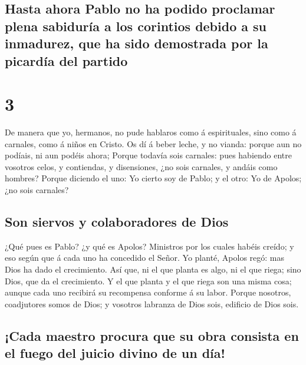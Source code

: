 \hypertarget{hasta-ahora-pablo-no-ha-podido-proclamar-plena-sabiduruxeda-a-los-corintios-debido-a-su-inmadurez-que-ha-sido-demostrada-por-la-picarduxeda-del-partido}{%
\subsection{Hasta ahora Pablo no ha podido proclamar plena sabiduría a
los corintios debido a su inmadurez, que ha sido demostrada por la
picardía del
partido}\label{hasta-ahora-pablo-no-ha-podido-proclamar-plena-sabiduruxeda-a-los-corintios-debido-a-su-inmadurez-que-ha-sido-demostrada-por-la-picarduxeda-del-partido}}

\hypertarget{section-46-3}{%
\section{3}\label{section-46-3}}

 De manera que yo, hermanos, no pude hablaros como á
espirituales, sino como á carnales, como á niños en Cristo.
 Os dí á beber leche, y no vianda: porque aun no podíais,
ni aun podéis ahora;  Porque todavía sois carnales: pues
habiendo entre vosotros celos, y contiendas, y disensiones, ¿no sois
carnales, y andáis como hombres?  Porque diciendo el uno:
Yo cierto soy de Pablo; y el otro: Yo de Apolos; ¿no sois carnales?

\hypertarget{son-siervos-y-colaboradores-de-dios}{%
\subsection{Son siervos y colaboradores de
Dios}\label{son-siervos-y-colaboradores-de-dios}}

 ¿Qué pues es Pablo? ¿y qué es Apolos? Ministros por los
cuales habéis creído; y eso según que á cada uno ha concedido el Señor.
 Yo planté, Apolos regó: mas Dios ha dado el crecimiento.
 Así que, ni el que planta es algo, ni el que riega; sino
Dios, que da el crecimiento.  Y el que planta y el que
riega son una misma cosa; aunque cada uno recibirá su recompensa
conforme á su labor.  Porque nosotros, coadjutores somos
de Dios; y vosotros labranza de Dios sois, edificio de Dios sois.

\hypertarget{cada-maestro-procura-que-su-obra-consista-en-el-fuego-del-juicio-divino-de-un-duxeda}{%
\subsection{¡Cada maestro procura que su obra consista en el fuego del
juicio divino de un
día!}\label{cada-maestro-procura-que-su-obra-consista-en-el-fuego-del-juicio-divino-de-un-duxeda}}

